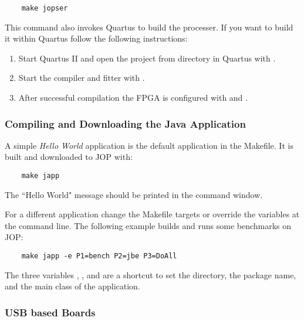 \begin{lstlisting}
    make jopser
\end{lstlisting}

This command also invokes Quartus to build the processer. If you
want to build it within Quartus follow the following instructions:

\label{subsubsec:quartus}

\begin{enumerate}
  \item Start Quartus II and open the project  from
      directory  in Quartus with
      .
  \item Start the compiler and fitter with .
  \item After successful compilation the FPGA is configured with
       and .
\end{enumerate}



\subsubsection{Compiling and Downloading the Java Application}

A simple \emph{Hello World} application is the default application
in the Makefile. It is built and downloaded to JOP with:

\begin{lstlisting}
    make japp
\end{lstlisting}

The ``Hello World" message should be printed in the command window.

For a different application change the Makefile targets or override
the  variables at the command line. The following example
builds and runs some benchmarks on JOP:

\begin{lstlisting}
    make japp -e P1=bench P2=jbe P3=DoAll
\end{lstlisting}

The three variables , , and  are a
shortcut to set the directory, the package name, and the main class
of the application.

\subsubsection{USB based Boards}

